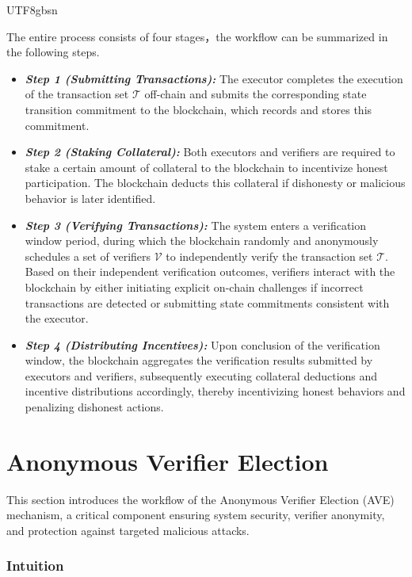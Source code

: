 \documentclass[runningheads]{llncs}
\begin{document}
\begin{CJK*}{UTF8}{gbsn}
\begin{itemize}[noitemsep, left=0pt]
\end{itemize}

The entire process consists of four stages，the workflow can be summarized in the following steps.

\begin{itemize}
    \item \textit{\textbf{Step 1 (Submitting Transactions):}} The executor completes the execution of the transaction set $\mathcal{T}$ off-chain and submits the corresponding state transition commitment to the blockchain, which records and stores this commitment.

    \item \textit{\textbf{Step 2 (Staking Collateral):}} Both executors and verifiers are required to stake a certain amount of collateral to the blockchain to incentivize honest participation. The blockchain deducts this collateral if dishonesty or malicious behavior is later identified.

    \item \textit{\textbf{Step 3 (Verifying Transactions):}} The system enters a verification window period, during which the blockchain randomly and anonymously schedules a set of verifiers $\mathcal{V}$ to independently verify the transaction set $\mathcal{T}$. Based on their independent verification outcomes, verifiers interact with the blockchain by either initiating explicit on-chain challenges if incorrect transactions are detected or submitting state commitments consistent with the executor.

    \item \textit{\textbf{Step 4 (Distributing Incentives):}} Upon conclusion of the verification window, the blockchain aggregates the verification results submitted by executors and verifiers, subsequently executing collateral deductions and incentive distributions accordingly, thereby incentivizing honest behaviors and penalizing dishonest actions.
\end{itemize}

\section{Anonymous Verifier Election}
This section introduces the workflow of the Anonymous Verifier Election (AVE) mechanism, a critical component ensuring system security, verifier anonymity, and protection against targeted malicious attacks.

\subsubsection{Intuition}


\end{CJK*}
\end{document}

